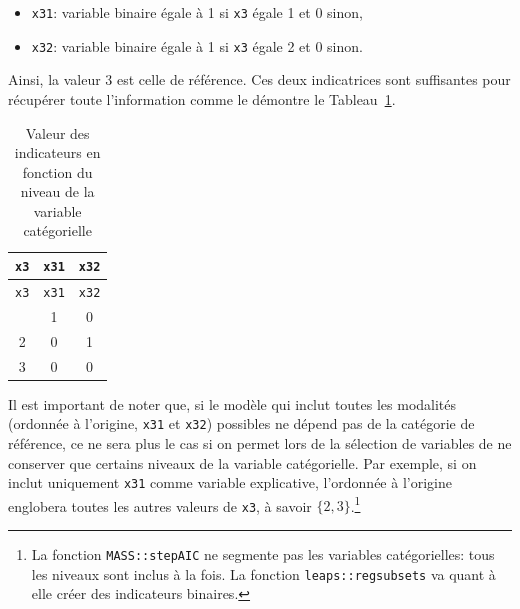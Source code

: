 \documentclass[
  11pt,
  letterpaper,
]{scrbook}
\providecommand{\tightlist}{%
  \setlength{\itemsep}{0pt}\setlength{\parskip}{0pt}}\usepackage{longtable,booktabs,array}
\theoremstyle{definition}
\theoremstyle{remark}
\begin{document}
\begin{itemize}
\tightlist
\item
  \texttt{x31}: variable binaire égale à 1 si \texttt{x3} égale 1 et 0
  sinon,
\item
  \texttt{x32}: variable binaire égale à 1 si \texttt{x3} égale 2 et 0
  sinon.
\end{itemize}

Ainsi, la valeur 3 est celle de référence. Ces deux indicatrices sont
suffisantes pour récupérer toute l'information comme le démontre le
Tableau~\ref{tbl-02-dummy}.

\hypertarget{tbl-02-dummy}{}
\begin{longtable}[]{@{}ccc@{}}
\caption{\label{tbl-02-dummy}Valeur des indicateurs en fonction du
niveau de la variable catégorielle}\tabularnewline
\toprule\noalign{}
\texttt{x3} & \texttt{x31} & \texttt{x32} \\
\midrule\noalign{}
\endfirsthead
\toprule\noalign{}
\texttt{x3} & \texttt{x31} & \texttt{x32} \\
\midrule\noalign{}
\endhead
\bottomrule\noalign{}
\endlastfoot
1 & 1 & 0 \\
2 & 0 & 1 \\
3 & 0 & 0 \\
\end{longtable}

Il est important de noter que, si le modèle qui inclut toutes les
modalités (ordonnée à l'origine, \texttt{x31} et \texttt{x32}) possibles
ne dépend pas de la catégorie de référence, ce ne sera plus le cas si on
permet lors de la sélection de variables de ne conserver que certains
niveaux de la variable catégorielle. Par exemple, si on inclut
uniquement \texttt{x31} comme variable explicative, l'ordonnée à
l'origine englobera toutes les autres valeurs de \texttt{x3}, à savoir
\(\{2, 3\}\).\footnote{La fonction \texttt{MASS::stepAIC} ne segmente
  pas les variables catégorielles: tous les niveaux sont inclus à la
  fois. La fonction \texttt{leaps::regsubsets} va quant à elle créer des
  indicateurs binaires.}
\end{document}
